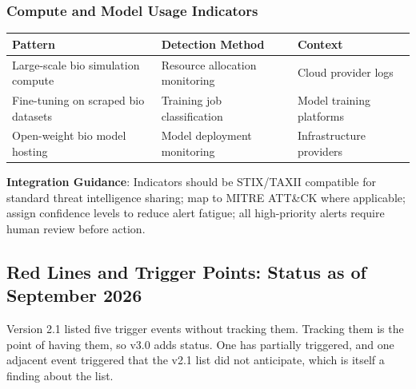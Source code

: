 \documentclass[11pt,letterpaper]{article}
\begin{document}
\subsubsection*{Compute and Model Usage Indicators}

\begin{center}
\small
\begin{tabular}{L{4cm}L{4cm}L{4cm}}
\toprule
\textbf{Pattern} & \textbf{Detection Method} & \textbf{Context} \\
\midrule
Large-scale bio simulation compute & Resource allocation monitoring & Cloud provider logs \\
Fine-tuning on scraped bio datasets & Training job classification & Model training platforms \\
Open-weight bio model hosting & Model deployment monitoring & Infrastructure providers \\
\bottomrule
\end{tabular}
\end{center}

\textbf{Integration Guidance}: Indicators should be STIX/TAXII compatible for standard threat intelligence sharing; map to MITRE ATT\&CK where applicable; assign confidence levels to reduce alert fatigue; all high-priority alerts require human review before action.

\subsection{Red Lines and Trigger Points: Status as of September 2026}

Version 2.1 listed five trigger events without tracking them. Tracking them is the point of having them, so v3.0 adds status. One has partially triggered, and one adjacent event triggered that the v2.1 list did not anticipate, which is itself a finding about the list.
\end{document}
